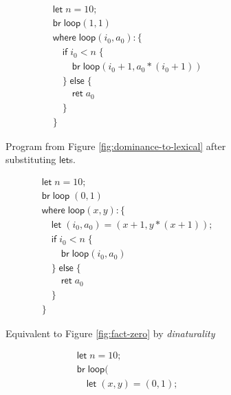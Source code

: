 \documentclass[acmsmall,screen,review]{acmart}
\newcommand{\ms}[1]{\ensuremath{\mathsf{#1}}}
\begin{document}
\begin{figure}
  \begin{minipage}{.5\textwidth}
    \begin{subfigure}{\textwidth}
      \begin{align*}
        & \ms{let}\;n = 10; \\
        & \ms{br}\;\ms{loop}(1, 1) \\
        & \ms{where}\;\ms{loop}(i_0, a_0): \{\\
        & \quad \ms{if}\;i_0 < n\;\{ \\
        & \qquad \ms{br}\;\ms{loop}(i_0 + 1, a_0 * (i_0 + 1)) \\
        & \quad \}\;\ms{else}\;\{ \\
        & \qquad \ms{ret}\;a_0 \\
        & \quad \} \\
        & \}
      \end{align*}
      \caption{Program from Figure \ref{fig:dominance-to-lexical} after substituting \ms{let}s.}
      \label{fig:fact-subst-2}
    \end{subfigure}
    \begin{subfigure}{\textwidth}
      \begin{align*}
        & \ms{let}\;n = 10; \\
        & \ms{br}\;\ms{loop}\;(0, 1) \\
        & \ms{where}\;\ms{loop}(x, y): \{\\
        & \quad \ms{let}\;(i_0, a_0) = (x + 1, y * (x + 1)); \\
        & \quad \ms{if}\;i_0 < n\;\{ \\
        & \qquad \ms{br}\;\ms{loop}(i_0, a_0) \\
        & \quad \}\;\ms{else}\;\{ \\
        & \qquad \ms{ret}\;a_0 \\
        & \quad \} \\
        & \}
      \end{align*}
      \caption{Equivalent to Figure \ref{fig:fact-zero} by \textit{dinaturality}}
      \label{fig:fact-dinat}
    \end{subfigure}
  \end{minipage}%
  \begin{subfigure}[c]{.5\textwidth}
    \begin{align*}
      & \ms{let}\;n = 10; \\
      & \ms{br}\;\ms{loop}( \\
      & \quad \ms{let}\;(x, y) = (0, 1); \\

\end{align*}
\end{subfigure}
\end{figure}
\end{document}
